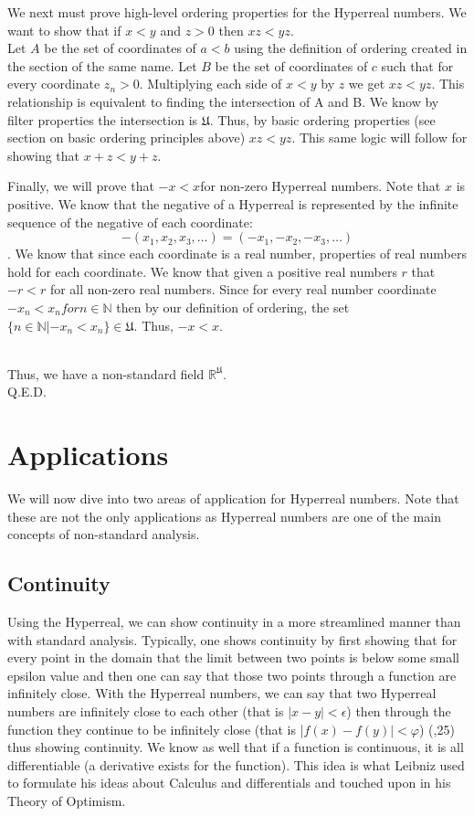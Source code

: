 \documentclass[12pt]{report}
\newcommand{\R}{\mathbb{R}}
\newcommand{\N}{\mathbb{N}}
\newcommand{\U}{\mathfrak{U}}
\begin{document}
We next must prove high-level ordering properties for the Hyperreal numbers. \newline
We want to show that if $x<y$ and $z>0$ then $xz<yz$. \\
Let $A$ be the set of coordinates of $a<b$ using the definition of ordering created in the section of the same name.
Let $B$ be the set of coordinates of $c$ such that for every coordinate $z_n > 0$.
Multiplying each side of $x<y$ by $z$ we get $xz<yz$.
This relationship is equivalent to finding the intersection of A and B.
We know by filter properties the intersection is $\U$.
Thus, by basic ordering properties (see section on basic ordering principles above) $xz<yz$.
This same logic will follow for showing that $x+z < y+z$.

\newline \par
Finally, we will prove that $-x <x $for non-zero Hyperreal numbers.
Note that $x$ is positive.
We know that the negative of a Hyperreal is represented by the infinite sequence of the negative of each coordinate: \[-(x_1, x_2,x_3,\ldots) = (-x_1,- x_2,-x_3,\ldots)\] .
We know that since each coordinate is a real number, properties of real numbers hold for each coordinate.
We know that given a positive real numbers $r$ that $-r< r$ for all non-zero real numbers.
Since for every real number coordinate $-x_n <x_n for n \in \N $ then by our definition of ordering, the set $\{n \in \N| -x_n < x_n \} \in \U$.
Thus, $-x <x $.

\\ \newline
Thus, we have a non-standard field $\R^{\U}$.\\
Q.E.D.


\chapter{Applications}
We will now dive into two areas of application for Hyperreal numbers.
Note that these are not the only applications as Hyperreal numbers are one of the main concepts of non-standard analysis.
\section*{Continuity}
Using the Hyperreal, we can show continuity in a more streamlined manner than with standard analysis.
Typically, one shows continuity by first showing that for every point in the domain that the limit between two points is below some small epsilon value and then one can say that those two points through a function are infinitely close.
With the Hyperreal numbers, we can say that two Hyperreal numbers are infinitely close to each other (that is $|x-y|< \epsilon$) then through the function they continue to be infinitely close (that is |$f(x)-f(y)|<\varphi$) (\citeauthor{Goldbring},25) thus showing continuity.
We know as well that if a function is continuous, it is all differentiable (a derivative exists for the function).
This idea is what Leibniz used to formulate his ideas about Calculus and differentials and touched upon in his Theory of Optimism.
\end{document}
